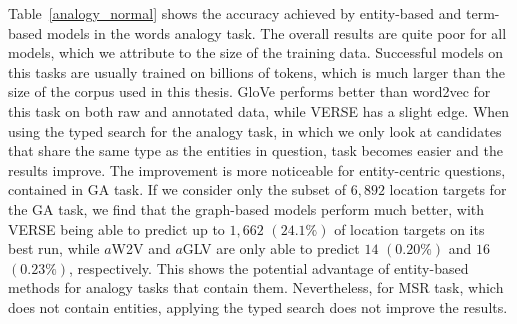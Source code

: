Table~\ref{analogy_normal} shows the accuracy achieved by entity-based and term-based models in the words analogy task. The overall results are quite poor for all models, which we attribute to the size of the training data. Successful models on this tasks are usually trained on billions of tokens, which is much larger than the size of the corpus used in this thesis. GloVe performs better than word2vec for this task on both raw and annotated data, while VERSE has a slight edge. When using the typed search for the analogy task, in which we only look at candidates that share the same type as the entities in question, task becomes easier and the results improve. The improvement is more noticeable for entity-centric questions, contained in GA task. If we consider only the subset of $6,892$ location targets for the GA task, we find that the graph-based models perform much better, with VERSE being able to predict up to $1,662$ $(24.1\%)$ of location targets on its best run, while $a$W2V and $a$GLV are only able to predict $14$ $(0.20\%)$ and $16$ $(0.23\%)$, respectively. This shows the potential advantage of entity-based methods for analogy tasks that contain them. Nevertheless, for MSR task, which does not contain entities, applying the typed search does not improve the results. 
\begin{table}[t]
\caption{Word analogy results. Shown is the prediction accuracy for the normal analogy tasks and the variation where predictions are limited to the correct entity type. The best two values per task and variation are highlighted.}
\label{analogy_normal}
\setlength{\tabcolsep}{2pt} %
\renewcommand{\arraystretch}{1.0} %
\end{table}

